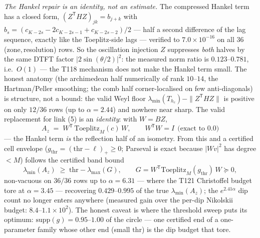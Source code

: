 \documentclass[11pt,a4paper]{article}
\begin{document}
\emph{The Hankel repair is an identity, not an estimate.} The compressed Hankel term has a
closed form, $(Z^{\mathsf T}HZ)_{jk}=b_{j+k}$ with $b_s=(c_{K-2s}-2c_{K-2s-1}+c_{K-2s-2})/2$
--- half a second difference of the lag sequence, exactly like the Toeplitz-side lags ---
verified to $7.0\times10^{-16}$ on all $36$ (zone,\,resolution) rows. So the oscillation
injection $Z$ suppresses \emph{both} halves by the same DTFT factor $|2\sin(\theta/2)|^2$: the
measured norm ratio is $0.123$--$0.781$, i.e.\ $O(1)$ --- the T118 mechanism does not make the
Hankel term small. The honest anatomy (the archimedean half numerically of rank $10$--$14$, the
Hartman/Peller smoothing; the comb half corner-localised on few anti-diagonals) is structure,
not a bound: the valid Weyl floor $\lambda_{\min}(T_{h_c})-\|Z^{\mathsf T}HZ\|$ is positive on
only $12/36$ rows (up to $\alpha=2.44$) and nowhere near sharp. The valid replacement for link
(5) is an \emph{identity}: with $W=BZ$,
\[
A_z\;=\;W^{\mathsf T}\,\mathrm{Toeplitz}_M(c)\,W,\qquad W^{\mathsf T}W=I\ \ \text{(exact to $0.0$)}
\]
--- the Hankel term \emph{is} the reflection half of an isometry. From this and a certified
cell envelope ($g_{\mathrm{thr}}=(\mathrm{thr}-\ell)_+\ge0$; Parseval is exact because $|Wv|^2$
has degree $<M$) follows the certified band bound
\[
\lambda_{\min}(A_z)\;\ge\;\mathrm{thr}-\lambda_{\max}(G),\qquad
G=W^{\mathsf T}\mathrm{Toeplitz}_M(g_{\mathrm{thr}})\,W\succeq0,
\]
non-vacuous on $36/36$ rows up to $\alpha=6.31$ --- where the T121 Christoffel budget tore at
$\alpha=3.45$ --- recovering $0.429$--$0.995$ of the true $\lambda_{\min}(A_z)$; the
$e^{2.41\alpha}$ dip count no longer enters anywhere (measured gain over the per-dip Nikolskii
budget: $8.4$--$1.1\times10^{2}$). The honest caveat is where the threshold sweep puts its
optimum: $\mathrm{supp}(g)=0.95$--$1.00$ of the circle --- one certified end of a one-parameter
family whose other end (small $\mathrm{thr}$) is the dip budget that tore.
\end{document}
